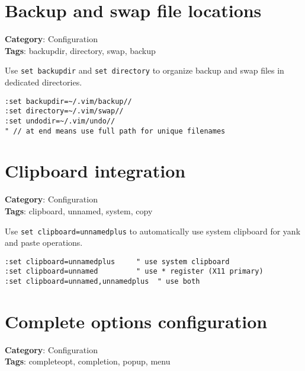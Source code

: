 \section{Backup and swap file locations}

\textbf{Category}: Configuration\\ \textbf{Tags}: backupdir, directory, swap, backup
\vspace{0.5cm}

Use {\footnotesize \Verb§set backupdir§} and {\footnotesize \Verb§set directory§} to organize backup and swap files in dedicated directories.

\begin{Exa*}{}
\begin{Verbatim}[fontsize=\footnotesize, breaklines, breakanywhere]
:set backupdir=~/.vim/backup//
:set directory=~/.vim/swap//
:set undodir=~/.vim/undo//
" // at end means use full path for unique filenames
\end{Verbatim}
\end{Exa*}

\section{Clipboard integration}

\textbf{Category}: Configuration\\ \textbf{Tags}: clipboard, unnamed, system, copy
\vspace{0.5cm}

Use {\footnotesize \Verb§set clipboard=unnamedplus§} to automatically use system clipboard for yank and paste operations.

\begin{Exa*}{}
\begin{Verbatim}[fontsize=\footnotesize, breaklines, breakanywhere]
:set clipboard=unnamedplus     " use system clipboard
:set clipboard=unnamed         " use * register (X11 primary)
:set clipboard=unnamed,unnamedplus  " use both
\end{Verbatim}
\end{Exa*}

\section{Complete options configuration}

\textbf{Category}: Configuration\\ \textbf{Tags}: completeopt, completion, popup, menu
\vspace{0.5cm}

